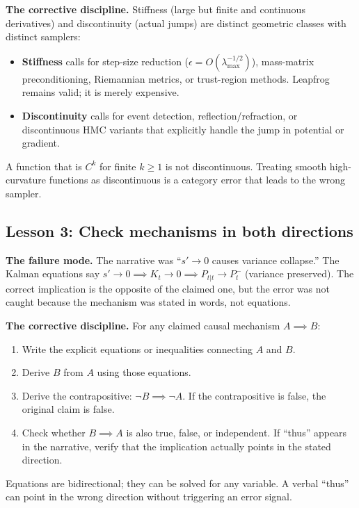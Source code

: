 \textbf{The corrective discipline.} Stiffness (large but finite and continuous derivatives) and discontinuity (actual jumps) are distinct geometric classes with distinct samplers:
\begin{itemize}
\item \textbf{Stiffness} calls for step-size reduction ($\epsilon = O(\lambda_{\max}^{-1/2})$), mass-matrix preconditioning, Riemannian metrics, or trust-region methods. Leapfrog remains valid; it is merely expensive.
\item \textbf{Discontinuity} calls for event detection, reflection/refraction, or discontinuous HMC variants that explicitly handle the jump in potential or gradient.
\end{itemize}

A function that is $C^k$ for finite $k \geq 1$ is not discontinuous. Treating smooth high-curvature functions as discontinuous is a category error that leads to the wrong sampler.

\subsection{Lesson 3: Check mechanisms in both directions}

\textbf{The failure mode.} The narrative was ``$s' \to 0$ causes variance collapse.'' The Kalman equations say $s' \to 0 \implies K_t \to 0 \implies P_{t|t} \to P_t^-$ (variance preserved). The correct implication is the opposite of the claimed one, but the error was not caught because the mechanism was stated in words, not equations.

\textbf{The corrective discipline.} For any claimed causal mechanism $A \implies B$:
\begin{enumerate}
\item Write the explicit equations or inequalities connecting $A$ and $B$.
\item Derive $B$ from $A$ using those equations.
\item Derive the contrapositive: $\neg B \implies \neg A$. If the contrapositive is false, the original claim is false.
\item Check whether $B \implies A$ is also true, false, or independent. If ``thus'' appears in the narrative, verify that the implication actually points in the stated direction.
\end{enumerate}

Equations are bidirectional; they can be solved for any variable. A verbal ``thus'' can point in the wrong direction without triggering an error signal.

